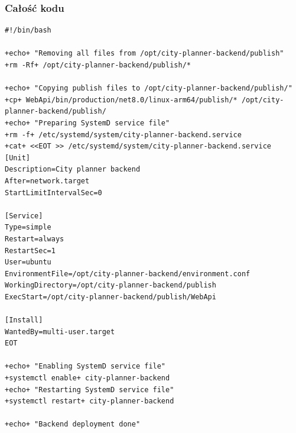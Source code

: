 \subsubsection{Całość kodu}
\begin{lstlisting}[style=shell-colored,label={lst:db7}]
#!/bin/bash

+echo+ "Removing all files from /opt/city-planner-backend/publish"
+rm -Rf+ /opt/city-planner-backend/publish/*

+echo+ "Copying publish files to /opt/city-planner-backend/publish/"
+cp+ WebApi/bin/production/net8.0/linux-arm64/publish/* /opt/city-planner-backend/publish/
+echo+ "Preparing SystemD service file"
+rm -f+ /etc/systemd/system/city-planner-backend.service
+cat+ <<EOT >> /etc/systemd/system/city-planner-backend.service
[Unit]
Description=City planner backend
After=network.target
StartLimitIntervalSec=0

[Service]
Type=simple
Restart=always
RestartSec=1
User=ubuntu
EnvironmentFile=/opt/city-planner-backend/environment.conf
WorkingDirectory=/opt/city-planner-backend/publish
ExecStart=/opt/city-planner-backend/publish/WebApi

[Install]
WantedBy=multi-user.target
EOT

+echo+ "Enabling SystemD service file"
+systemctl enable+ city-planner-backend
+echo+ "Restarting SystemD service file"
+systemctl restart+ city-planner-backend

+echo+ "Backend deployment done"
\end{lstlisting}
